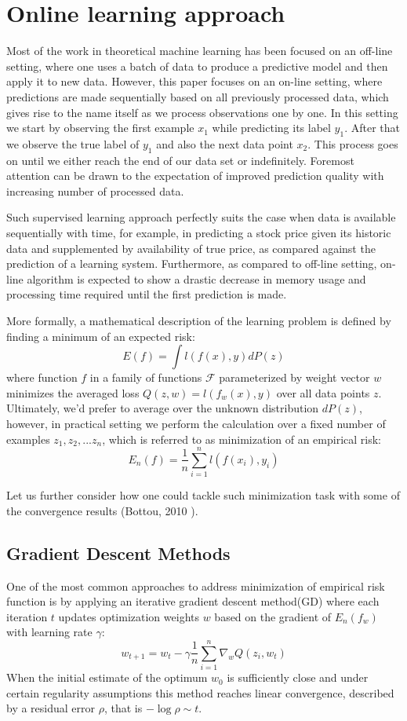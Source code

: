 
\section{Online learning approach}
Most of the work in theoretical machine learning has been focused on an off-line setting, where one uses a batch of data to produce a predictive model and then apply it to new data. However, this paper focuses on an on-line setting, where predictions are made sequentially based on all previously processed data, which gives rise to the name itself as we process observations one by one. In this setting we start by observing the first example $x_1$ while predicting its label $y_1$. After that we observe the true label of $y_1$ and also the next data point $x_2$. This process goes on until we either reach the end of our data set or indefinitely. Foremost attention can be drawn to the expectation of improved prediction quality with increasing number of processed data.

Such supervised learning approach perfectly suits the case when data is available sequentially with time, for example, in predicting a stock price given its historic data and supplemented by availability of true price, as compared against the prediction of a learning system. Furthermore, as compared to off-line setting, on-line algorithm is expected to show a drastic decrease in memory usage and processing time required until the first prediction is made.

More formally, a mathematical description of the learning problem is defined by finding a minimum of an expected risk:
$$E(f)=\int l(f(x),y)dP(z)$$
where function $f$ in a family of functions $\mathcal{F}$ parameterized by weight vector $w$ minimizes the averaged loss $Q(z,w)=l(f_w(x),y)$ over all data points $z$. Ultimately, we'd prefer to average over the unknown distribution $dP(z)$, however, in practical setting we perform the calculation over a fixed number of examples $z_1, z_2,...z_n$, which is referred to as minimization of an empirical risk:
$$E_n(f)=\frac{1}{n} \sum\limits_{i=1}^{n}l(f(x_i),y_i)$$

Let us further consider how one could tackle such minimization task with some of the convergence results (Bottou, 2010 \cite{bottou-2010}).

\subsection{Gradient Descent Methods}
One of the most common approaches to address minimization of empirical risk function is by applying an iterative gradient descent method(GD) where each iteration $t$ updates optimization weights $w$ based on the gradient of $E_n(f_w)$ with learning rate $\gamma$:
$$w_{t+1}=w_t-\gamma \frac{1}{n} \sum\limits_{i=1}^{n} \nabla_w Q(z_i, w_t)$$
When the initial estimate of the optimum $w_0$ is sufficiently close and under certain regularity assumptions this method reaches linear convergence, described by a residual error $\rho$, that is $-\log\rho \sim t$. 

